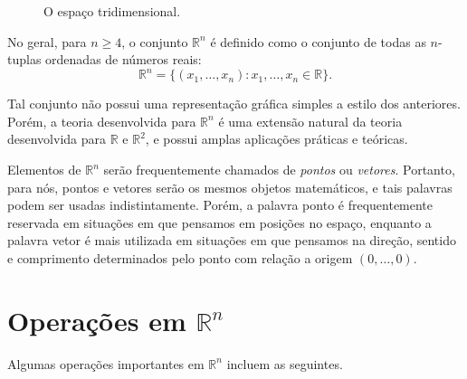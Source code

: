 \begin{figure}[ht]
    \centering
    \caption{O espaço tridimensional.}
\end{figure}

No geral, para $n\geq 4$, o conjunto $\mathbb R^n$ é definido como o conjunto de todas as $n$-tuplas ordenadas de números reais:
\begin{equation*}
    \mathbb R^n = \{(x_1, \ldots, x_n) : x_1, \ldots, x_n \in \mathbb R\}.
\end{equation*}

Tal conjunto não possui uma representação gráfica simples a estilo dos anteriores.
Porém, a teoria desenvolvida para $\mathbb R^n$ é uma extensão natural da teoria desenvolvida para $\mathbb R$ e $\mathbb R^2$, e possui amplas aplicações práticas e teóricas.

Elementos de $\mathbb R^n$ serão frequentemente chamados de \emph{pontos} ou \emph{vetores}.
Portanto, para nós, pontos e vetores serão os mesmos objetos matemáticos, e tais palavras podem ser usadas indistintamente.
Porém, a palavra ponto é frequentemente reservada em situações em que pensamos em posições no espaço, enquanto a palavra vetor é mais utilizada em situações em que pensamos na direção, sentido e comprimento determinados pelo ponto com relação a origem $(0, \ldots, 0)$.
\section{Operações em $\mathbb R^n$}

Algumas operações importantes em $\mathbb R^n$ incluem as seguintes.

